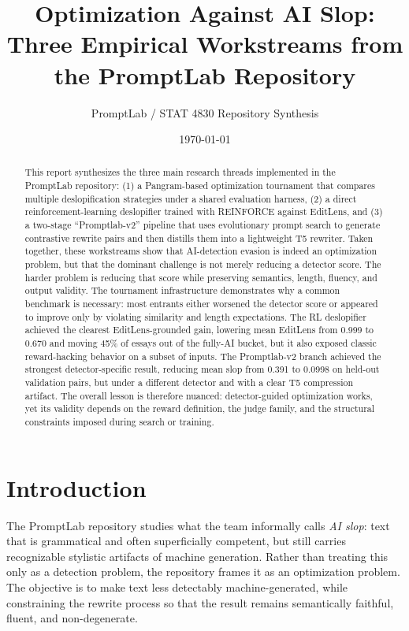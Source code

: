 \documentclass[11pt]{article}
\title{Optimization Against AI Slop:\\Three Empirical Workstreams from the PromptLab Repository}
\author{PromptLab / STAT 4830 Repository Synthesis}
\date{\today}
\begin{document}
\maketitle

\begin{abstract}
This report synthesizes the three main research threads implemented in the PromptLab repository: (1) a Pangram-based optimization tournament that compares multiple deslopification strategies under a shared evaluation harness, (2) a direct reinforcement-learning deslopifier trained with REINFORCE against EditLens, and (3) a two-stage ``Promptlab-v2'' pipeline that uses evolutionary prompt search to generate contrastive rewrite pairs and then distills them into a lightweight T5 rewriter. Taken together, these workstreams show that AI-detection evasion is indeed an optimization problem, but that the dominant challenge is not merely reducing a detector score. The harder problem is reducing that score while preserving semantics, length, fluency, and output validity. The tournament infrastructure demonstrates why a common benchmark is necessary: most entrants either worsened the detector score or appeared to improve only by violating similarity and length expectations. The RL deslopifier achieved the clearest EditLens-grounded gain, lowering mean EditLens from 0.999 to 0.670 and moving 45\% of essays out of the fully-AI bucket, but it also exposed classic reward-hacking behavior on a subset of inputs. The Promptlab-v2 branch achieved the strongest detector-specific result, reducing mean slop from 0.391 to 0.0998 on held-out validation pairs, but under a different detector and with a clear T5 compression artifact. The overall lesson is therefore nuanced: detector-guided optimization works, yet its validity depends on the reward definition, the judge family, and the structural constraints imposed during search or training.
\end{abstract}

\section{Introduction}

The PromptLab repository studies what the team informally calls \emph{AI slop}: text that is grammatical and often superficially competent, but still carries recognizable stylistic artifacts of machine generation. Rather than treating this only as a detection problem, the repository frames it as an optimization problem. The objective is to make text less detectably machine-generated, while constraining the rewrite process so that the result remains semantically faithful, fluent, and non-degenerate.
\end{document}

